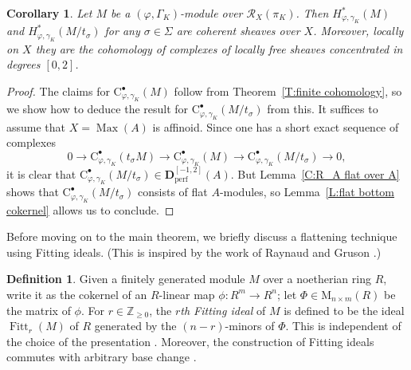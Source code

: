 \documentclass[12pt]{article}
\newtheorem{cor}[theorem]{Corollary}
\theoremstyle{definition}
\newtheorem{defn}[theorem]{Definition}
\numberwithin{equation}{theorem}
\newcommand{\calR}{\mathcal{R}}
\newcommand{\ZZ}{\mathbb{Z}}
\newcommand{\bbD}{\mathbf{D}}
\newcommand{\rmC}{\mathrm{C}}
\newcommand{\perf}{\mathrm{perf}}
\DeclareMathOperator{\Fitt}{Fitt}
\DeclareMathOperator{\Max}{Max}
\begin{document}
\begin{cor}
\label{C:finite cohomology sheaf}
Let $M$ be a $(\varphi, \Gamma_K)$-module over $\calR_X(\pi_K)$.  Then $H^*_{\varphi, \gamma_K}(M)$ and $H^*_{\varphi, \gamma_K}(M/t_\sigma)$ for any $\sigma \in \Sigma$ are coherent sheaves over $X$.  Moreover, locally on $X$ they are the cohomology of complexes of locally free sheaves concentrated in degrees $[0,2]$.
\end{cor}
\begin{proof}
The claims for $\rmC^\bullet_{\varphi,\gamma_K}(M)$ follow from
Theorem~\ref{T:finite cohomology}, so we show how to deduce the result
for $\rmC^\bullet_{\varphi,\gamma_K}(M/t_\sigma)$ from this.  It
suffices to assume that $X = \Max(A)$ is affinoid.  Since one has a
short exact sequence of complexes
\[
0 \to \rmC^\bullet_{\varphi,\gamma_K}(t_\sigma M) \to
\rmC^\bullet_{\varphi,\gamma_K}(M) \to
\rmC^\bullet_{\varphi,\gamma_K}(M/t_\sigma) \to 0,
\]
it is clear that $\rmC^\bullet_{\varphi,\gamma_K}(M/t_\sigma) \in
\bbD_\perf^{[-1,2]}(A)$.  But Lemma~\ref{C:R_A flat over A} shows that
$\rmC^\bullet_{\varphi,\gamma_K}(M/t_\sigma)$ consists of flat
$A$-modules, so Lemma~\ref{L:flat bottom cokernel} allows us to
conclude.
\end{proof}

Before moving on to the main theorem, we briefly discuss a flattening technique using Fitting ideals.  (This is inspired by the work of Raynaud and Gruson \cite{raynaud}.)

\begin{defn}
Given a finitely generated module $M$ over a noetherian ring $R$, write it as the cokernel of an $R$-linear map $\phi: R^m \to R^n$; let $\Phi \in \mathrm{M}_{n\times m}(R)$ be the matrix of $\phi$.
For $r \in \ZZ_{\geq 0}$, the \emph{$r$th Fitting ideal} of $M$ is defined to be the ideal $\Fitt_r(M)$ of $R$ generated by the $(n-r)$-minors of $\Phi$.  This is independent of the choice of the presentation \cite[Corollary-Definition~20.4]{eisenbud}.
Moreover, the construction of Fitting ideals commutes with arbitrary base change \cite[Corollary~20.5]{eisenbud}.
\end{defn}
\end{document}
